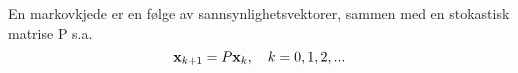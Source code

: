 En markovkjede er en følge av sannsynlighetsvektorer,
sammen med en stokastisk matrise P s.a.
$$\mathbf{x}_{k+1} = P\mathbf{x}_k,\quad k=0,1,2,...$$
